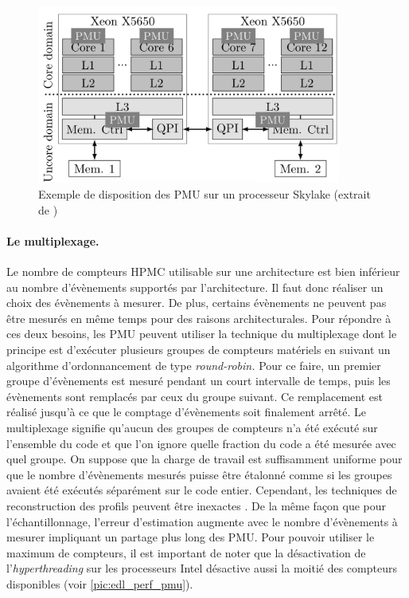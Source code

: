         \begin{figure}[ht!]
        \center
        \includegraphics[width=10cm]{images/yamb_skl_pmu.png}
        \caption{\label{pic:yamb_skl_pmu}Exemple de disposition des PMU sur un processeur Skylake (extrait de \cite{Selva2017})}
        \end{figure}
        
    
    \paragraph{Le multiplexage.}
        
            Le nombre de compteurs HPMC utilisable sur une architecture est bien inférieur au nombre d'évènements supportés par l'architecture. Il faut donc réaliser un choix des évènements à mesurer. De plus, certains évènements ne peuvent pas être mesurés en même temps pour des raisons architecturales. 
            Pour répondre à ces deux besoins, les PMU peuvent utiliser la technique du multiplexage dont le principe est d'exécuter plusieurs groupes de compteurs matériels en suivant un algorithme d'ordonnancement de type \textit{round-robin.} Pour ce faire, un premier groupe d'évènements est mesuré pendant un court intervalle de temps, puis les évènements sont remplacés par ceux du groupe suivant. Ce remplacement est réalisé jusqu'à ce que le comptage d'évènements soit finalement arrêté. Le multiplexage signifie qu'aucun des groupes de compteurs n'a été exécuté sur l'ensemble du code et que l'on ignore quelle fraction du code a été mesurée avec quel groupe. On suppose que la charge de travail est suffisamment uniforme pour que le nombre d'évènements mesurés puisse être étalonné comme si les groupes avaient été exécutés séparément sur le code entier. 
            Cependant, les techniques de reconstruction des profils peuvent être inexactes \cite{Lim}. De la même façon que pour l'échantillonnage, l'erreur d'estimation augmente avec le nombre d'évènements à mesurer impliquant un partage plus long des PMU. Pour pouvoir utiliser le maximum de compteurs, il est important de noter que la désactivation de l'\textit{hyperthreading} sur les processeurs Intel désactive aussi la moitié des compteurs disponibles (voir \autoref{pic:edl_perf_pmu}).


